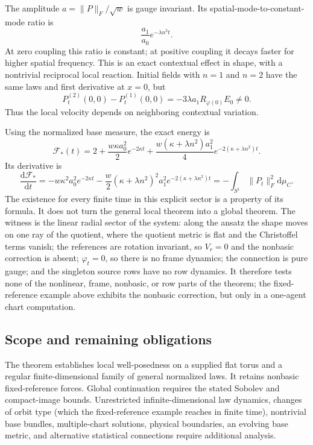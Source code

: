 The amplitude $a=\|P\|_F/\sqrt w$ is gauge invariant. Its spatial-mode-to-constant-mode ratio is
\begin{equation}
 \frac{a_1}{a_0}e^{-\lambda n^2t}.
\end{equation}
At zero coupling this ratio is constant; at positive coupling it decays faster for higher spatial frequency. This is an exact contextual effect in shape, with a nontrivial reciprocal local reaction. Initial fields with $n=1$ and $n=2$ have the same laws and first derivative at $x=0$, but
\begin{equation}
 P_t^{(2)}(0,0)-P_t^{(1)}(0,0)
 =-3\lambda a_1R_{\varphi(0)}E_0\ne0.
\end{equation}
Thus the local velocity depends on neighboring contextual variation.

Using the normalized base measure, the exact energy is
\begin{equation}
 \mathcal F_*(t)=2+\frac{w\kappa a_0^2}{2}e^{-2\kappa t}
 +\frac{w(\kappa+\lambda n^2)a_1^2}{4}
                         e^{-2(\kappa+\lambda n^2)t}.
 \label{ctx:c:eq:exactenergy}
\end{equation}
Its derivative is
\begin{equation}
 \frac{\mathrm d\mathcal F_*}{\mathrm d t}
 =-w\kappa^2a_0^2e^{-2\kappa t}
  -\frac w2(\kappa+\lambda n^2)^2a_1^2e^{-2(\kappa+\lambda n^2)t}
 =-\int_{S^1}\|P_t\|_F^2\mathrm d\mu_C.
\end{equation}
The existence for every finite time in this explicit sector is a property of its formula. It does not turn the general local theorem into a global theorem. The witness is the linear radial sector of the system: along the ansatz the shape moves on one ray of the quotient, where the quotient metric is flat and the Christoffel terms vanish; the references are rotation invariant, so $V_r=0$ and the nonbasic correction is absent; $\varphi_t=0$, so there is no frame dynamics; the connection is pure gauge; and the singleton source rows have no row dynamics. It therefore tests none of the nonlinear, frame, nonbasic, or row parts of the theorem; the fixed-reference example above exhibits the nonbasic correction, but only in a one-agent chart computation.

\subsection{Scope and remaining obligations}

The theorem establishes local well-posedness on a supplied flat torus and a regular finite-dimensional family of general normalized laws. It retains nonbasic fixed-reference forces. Global continuation requires the stated Sobolev and compact-image bounds. Unrestricted infinite-dimensional law dynamics, changes of orbit type (which the fixed-reference example reaches in finite time), nontrivial base bundles, multiple-chart solutions, physical boundaries, an evolving base metric, and alternative statistical connections require additional analysis.

